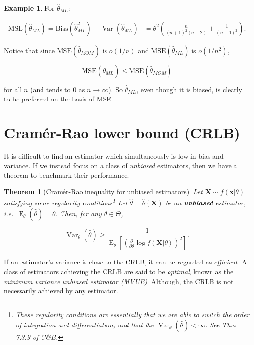 \documentclass[
]{book}
\newcommand{\bx}{{\boldsymbol x}}
\newcommand{\bX}{{\boldsymbol X}}
\DeclareMathOperator{\E}{E}
\DeclareMathOperator{\Var}{Var}
\newtheorem{theorem}{Theorem}[chapter]
\theoremstyle{definition}
\theoremstyle{definition}
\newtheorem{example}{Example}[chapter]
\theoremstyle{definition}
\theoremstyle{definition}
\theoremstyle{remark}
\begin{document}
\begin{example}
For \(\hat\theta_{ML}\):

\begin{align*}
\text{MSE}(\hat\theta_{ML})
= \text{Bias}(\hat\theta_{ML}^2) + \Var(\hat\theta_{ML}) 
&= \theta^2\left( \frac{n}{(n+1)^2(n+2)} + \frac{1}{(n+1)^2} \right). 
\end{align*}

Notice that since \(\text{MSE}(\hat\theta_{MOM})\) is \(o(1/n)\) and \(\text{MSE}(\hat\theta_{ML})\) is \(o(1/n^2)\),

\[\text{MSE}(\hat\theta_{ML}) \leq \text{MSE}(\hat\theta_{MOM})\]

for all \(n\) (and tends to 0 as \(n\to\infty\)). So \(\hat\theta_{ML}\), even though it is biased, is clearly to be preferred on the basis of MSE.
\end{example}

\hypertarget{cramuxe9r-rao-lower-bound-crlb}{%
\section{Cramér-Rao lower bound (CRLB)}\label{cramuxe9r-rao-lower-bound-crlb}}

It is difficult to find an estimator which simultaneously is low in bias and variance.
If we instead focus on a class of \emph{unbiased} estimators, then we have a theorem to benchmark their performance.

\begin{theorem}[Cramér-Rao inequality for unbiased estimators]
\protect\hypertarget{thm:crlb}{}\label{thm:crlb}Let \(\bX\sim f(\bx|\theta)\) satisfying some regularity conditions\footnote{These regularity conditions are essentially that we are able to switch the order of integration and differentiation, and that the \(\Var_\theta(\hat\theta)<\infty\). See Thm 7.3.9 of C\&B.}
Let \(\hat\theta=\hat\theta(\bX)\) be an \textbf{unbiased} estimator, i.e.~\(\E_\theta(\hat\theta)=\theta\).
Then, for any \(\theta\in\Theta\),

\[\Var_\theta(\hat\theta) \geq \frac{1}{\E_\theta\left[\left(\frac{\partial}{\partial \theta} \log f(\bX|\theta) \right)^2\right]}.\]
\end{theorem}

If an estimator's variance is close to the CRLB, it can be regarded as \emph{efficient}.
A class of estimators achieving the CRLB are said to be \emph{optimal}, known as the \emph{minimum variance unbiased estimator (MVUE)}. Although, the CRLB is not necessarily achieved by any estimator.
\end{document}
